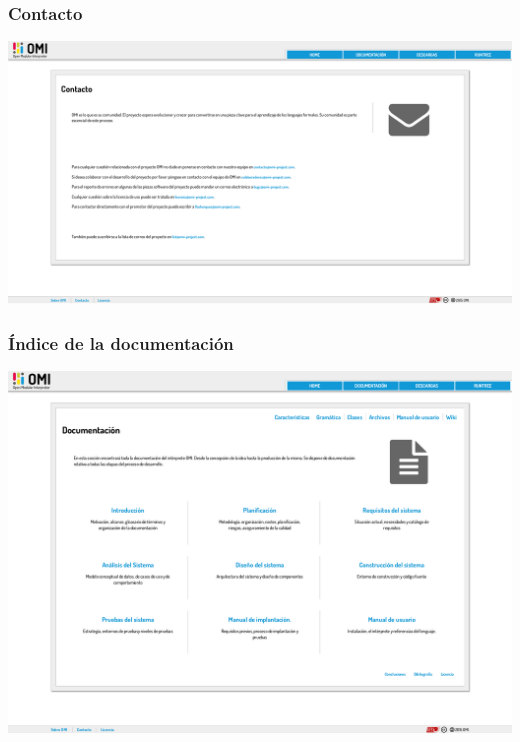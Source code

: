 \subsubsection{Contacto}
\begin{center}
\includegraphics[scale=0.2]{contact.png} \\
\end{center}

\subsubsection{Índice de la documentación}
\begin{center}
\includegraphics[scale=0.2]{doc-index.png} \\
\end{center}

